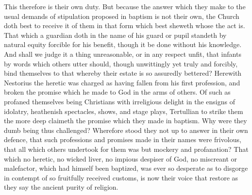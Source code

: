 This therefore is their own duty. But because the answer which they make to the usual demands of stipulation proposed in baptism is not their own, the Church doth best to receive it of them in that form which best sheweth whose the act is. That which a guardian doth in the name of his guard or pupil standeth by natural equity forcible for his benefit, though it be done without his knowledge. And shall we judge it a thing unreasonable, or in any respect unfit, that infants by words which others utter should, though unwittingly yet truly and forcibly, bind themselves to that whereby their estate is so assuredly bettered? Herewith Nestorius the heretic was charged as having fallen from his  first profession, and broken the promise which he made to God in the arms of others. Of such as profaned themselves being Christians with irreligious delight in the ensigns of idolatry, heathenish spectacles, shows, and stage plays, Tertullian to strike them the more deep claimeth the promise which they made in baptism. Why were they dumb being thus challenged? Wherefore stood they not up to answer in their own defence, that such professions and promises made in their names were frivolous, that all which others undertook for them was but mockery and profanation? That which no heretic, no wicked liver, no impious despiser of God, no miscreant or malefactor, which had himself been baptized, was ever so desperate as to disgorge in contempt of so fruitfully received customs, is now their voice that restore as they say the ancient purity of religion.


